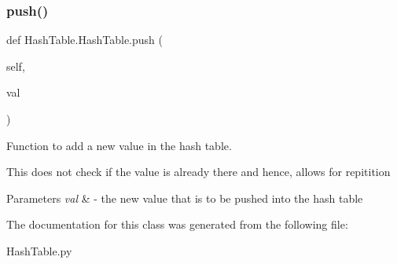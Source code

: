 \subsubsection{\texorpdfstring{push()}{push()}}
{\footnotesize\ttfamily def Hash\+Table.\+Hash\+Table.\+push (\begin{DoxyParamCaption}\item[{}]{self,  }\item[{}]{val }\end{DoxyParamCaption})}



Function to add a new value in the hash table. 

This does not check if the value is already there and hence, allows for repitition


\begin{DoxyParams}{Parameters}
{\em val} & -\/ the new value that is to be pushed into the hash table \\
\hline
\end{DoxyParams}


The documentation for this class was generated from the following file\+:\begin{DoxyCompactItemize}
\item 
Hash\+Table.\+py\end{DoxyCompactItemize}
